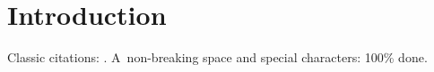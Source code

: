 \documentclass[11pt]{article}
\begin{document}
\section{Introduction}
Classic citations: \cite{knuth1984,lamport1994,smith2020}.
A~non-breaking space and special characters: 100\% done.



\end{document}
